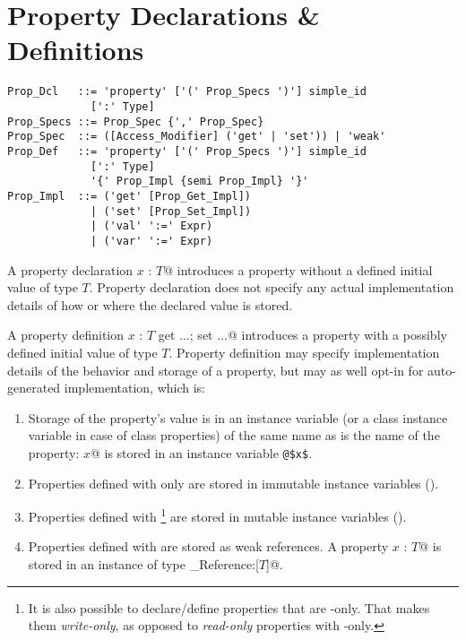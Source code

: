\section{Property Declarations \& Definitions}
\label{sec:property-dec-dfn}

\syntax\begin{lstlisting}
Prop_Dcl   ::= 'property' ['(' Prop_Specs ')'] simple_id 
             [':' Type]
Prop_Specs ::= Prop_Spec {',' Prop_Spec}
Prop_Spec  ::= ([Access_Modifier] ('get' | 'set')) | 'weak'
Prop_Def   ::= 'property' ['(' Prop_Specs ')'] simple_id 
             [':' Type]
             '{' Prop_Impl {semi Prop_Impl} '}'
Prop_Impl  ::= ('get' [Prop_Get_Impl])
             | ('set' [Prop_Set_Impl])
             | ('val' ':=' Expr)
             | ('var' ':=' Expr)
\end{lstlisting} %

A property declaration \lstinline@property $x$ : $T$@ introduces a property without a defined initial value of type $T$. Property declaration does not specify any actual implementation details of how or where the declared value is stored.

A property definition \lstinline@property $x$ : $T$ {get $\ldots$; set $\ldots$}@ introduces a property with a possibly defined initial value of type $T$. Property definition may specify implementation details of the behavior and storage of a property, but may as well opt-in for auto-generated implementation, which is: 

\begin{enumerate}
\item 
Storage of the property's value is in an instance variable (or a class instance variable in case of class properties) of the same name as is the name of the property: \lstinline@property $x$@ is stored in an instance variable \lstinline+@$x$+. 

\item
Properties defined with only  are stored in immutable instance variables (). 

\item
Properties defined with \footnote{It is also possible to declare/define properties that are -only. That makes them {\em write-only}, as opposed to {\em read-only} properties with -only.} are stored in mutable instance variables (). 

\item
Properties defined with  are stored as weak references. A property \lstinline@property $x$ : $T$@ is stored in an instance of type \lstinline@Weak_Reference:[$T$]@. 

\end{enumerate}

